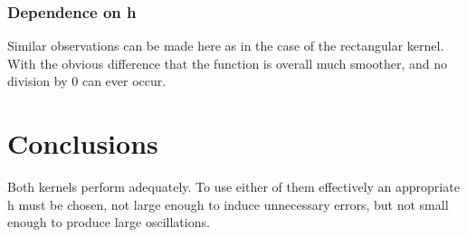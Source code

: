 \subsubsection{Dependence on h}
Similar observations can be made here as in the case of the rectangular kernel. With the obvious difference that the function is overall much smoother, and no division by 0 can ever occur.


\section{Conclusions}

Both kernels perform adequately. To use either of them effectively an appropriate h must be chosen, not large enough to induce unnecessary errors, but not small enough to produce large oscillations. 


